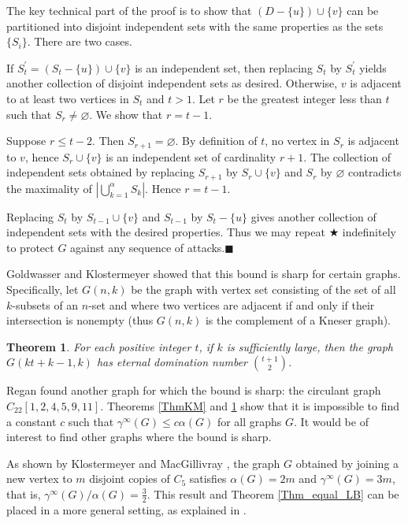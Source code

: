 \documentclass[12pt]{article}%
\newtheorem{theorem}{Theorem}[section]
\begin{document}
The key technical part of the proof is to show that $(D-\{u\})\cup\{v\}$ can
be partitioned into disjoint independent sets with the same properties as the
sets $\{S_{i}\}$. There are two cases.

If $S_{t}^{\prime}=(S_{t}-\{u\})\cup\{v\}$ is an independent set, then
replacing $S_{t}$ by $S_{t}^{\prime}$ yields another collection of disjoint
independent sets as desired. Otherwise, $v$ is adjacent to at least two
vertices in $S_{t}$ and $t>1$. Let $r$ be the greatest integer less than $t$
such that $S_{r}\neq\varnothing$. We show that $r=t-1$.

Suppose $r\leq t-2$. Then $S_{r+1}=\varnothing$. By definition of $t$, no
vertex in $S_{r}$ is adjacent to $v$, hence $S_{r}\cup\{v\}$ is an independent
set of cardinality $r+1$. The collection of independent sets obtained by
replacing $S_{r+1}$ by $S_{r}\cup\{v\}$ and $S_{r}$ by $\varnothing$
contradicts the maximality of $|\bigcup_{k=1}^{\alpha}S_{k}|$. Hence $r=t-1$.

Replacing $S_{t}$ by $S_{t-1}\cup\{v\}$ and $S_{t-1}$ by $S_{t}-\{u\}$ gives
another collection of independent sets with the desired properties. Thus we
may repeat $\bigstar$ indefinitely to protect $G$ against any sequence of
attacks.\hfill$\blacksquare$

\bigskip

Goldwasser and Klostermeyer \cite{GK} showed that this bound is sharp for
certain graphs. Specifically, let $G(n,k)$ be the graph with vertex set
consisting of the set of all $k$-subsets of an $n$-set and where two vertices
are adjacent if and only if their intersection is nonempty (thus $G(n,k)$ is
the complement of a Kneser graph).

\begin{theorem}
\label{ThmGK}\emph{\cite{GK}\hspace{0.1in}}For each positive integer $t$, if
$k$ is sufficiently large, then the graph $G(kt+k-1,k)$ has eternal domination
number ${\binom{t+1}{2}}$.
\end{theorem}

Regan \cite{regan} found another graph for which the bound is sharp: the
circulant graph $C_{22}[1,2,4,5,9,11]$. Theorems \ref{ThmKM} and \ref{ThmGK}
show that it is impossible to find a constant $c$ such that $\gamma^{\infty
}(G)\leq c\alpha(G)$ for all graphs $G$. It would be of interest to find other
graphs where the bound is sharp.

As shown by Klostermeyer and MacGillivray \cite{KM}, the graph $G$ obtained by
joining a new vertex to $m$ disjoint copies of $C_{5}$ satisfies
$\alpha(G)=2m$ and $\gamma^{\infty}(G)=3m$, that is, $\gamma^{\infty
}(G)/\alpha(G)=\frac{3}{2}$. This result and Theorem \ref{Thm_equal_LB} can be
placed in a more general setting, as explained in \cite{KM2}.
\end{document}
